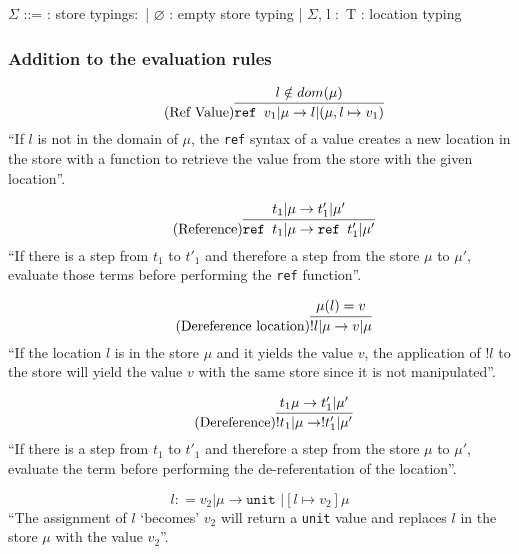 \begin{bnfgrammar}
    $\Sigma$ ::= : store typings$\colon$
    | $\varnothing$ : empty store typing
    | $\Sigma$, l $\colon$ T : location typing
\end{bnfgrammar}\leavevmode\newline

\subsubsection{Addition to the evaluation rules \cite{pierce2002ProgLang}}
\begin{equation*}
    \tag{Ref Value}
    \infer{
        \texttt{ref } v_1 | \mu \rightarrow l | (\mu, l \mapsto v_1)
    }{
        l \notin dom(\mu)
    }
\end{equation*}
``If $l$ is not in the domain of $\mu$, the \texttt{ref} syntax of a
value creates a new location in the store with a function to
retrieve the value from the store with the given location''.

\begin{equation*}
    \tag{Reference}
    \infer{
        \texttt{ref } t_1 | \mu \rightarrow \texttt{ref } t'_1 | \mu'
    }{
        t_1 | \mu \rightarrow t'_1 | \mu'
    }
\end{equation*}
``If there is a step from $t_1$ to $t'_1$ and therefore a step
from the store $\mu$ to $\mu'$, evaluate those terms before
performing the \texttt{ref} function''.

\begin{equation*}
    \tag{Dereference location}
    \infer{
        !l | \mu \rightarrow v | \mu
    }{
        \mu(l) = v
    }
\end{equation*}
``If the location $l$ is in the store $\mu$ and it yields the value $v$,
the application of $!l$ to the store will yield the value $v$ with the
same store since it is not manipulated''.

\begin{equation*}
    \tag{Dereference}
    \infer{
        !t_1 | \mu \rightarrow !t'_1 | \mu'
    }{
        t_1 \mu \rightarrow t'_1 | \mu'
    }
\end{equation*}
``If there is a step from $t_1$ to $t'_1$ and therefore a step
from the store $\mu$ to $\mu'$, evaluate the term before
performing the de-referentation of the location''.

\begin{equation*}
    \tag{Assignment}
    l \colon = v_2 | \mu \rightarrow \texttt{unit } | [l \mapsto v_2] \mu
\end{equation*}
``The assignment of $l$ `becomes' $v_2$ will return a \texttt{unit} value
and replaces $l$ in the store $\mu$ with the value $v_2$''.

